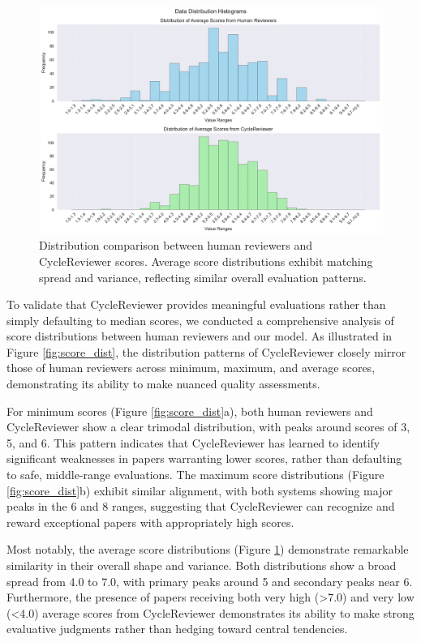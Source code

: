\documentclass{article} %
\begin{document}
\begin{figure}[h]
\centering
\includegraphics[width=\textwidth]{avgscore.pdf}
\caption{Distribution comparison between human reviewers and CycleReviewer scores.  Average score distributions exhibit matching spread and variance, reflecting similar overall evaluation patterns.}
\label{fig:score_dist2}
\end{figure}

To validate that CycleReviewer provides meaningful evaluations rather than simply defaulting to median scores, we conducted a comprehensive analysis of score distributions between human reviewers and our model. As illustrated in Figure \ref{fig:score_dist}, the distribution patterns of CycleReviewer closely mirror those of human reviewers across minimum, maximum, and average scores, demonstrating its ability to make nuanced quality assessments.

For minimum scores (Figure \ref{fig:score_dist}a), both human reviewers and CycleReviewer show a clear trimodal distribution, with peaks around scores of 3, 5, and 6. This pattern indicates that CycleReviewer has learned to identify significant weaknesses in papers warranting lower scores, rather than defaulting to safe, middle-range evaluations. The maximum score distributions (Figure \ref{fig:score_dist}b) exhibit similar alignment, with both systems showing major peaks in the 6 and 8 ranges, suggesting that CycleReviewer can recognize and reward exceptional papers with appropriately high scores.

Most notably, the average score distributions (Figure \ref{fig:score_dist2}) demonstrate remarkable similarity in their overall shape and variance. Both distributions show a broad spread from 4.0 to 7.0, with primary peaks around 5 and secondary peaks near 6. Furthermore, the presence of papers receiving both very high (>7.0) and very low (<4.0) average scores from CycleReviewer demonstrates its ability to make strong evaluative judgments rather than hedging toward central tendencies.
\end{document}
